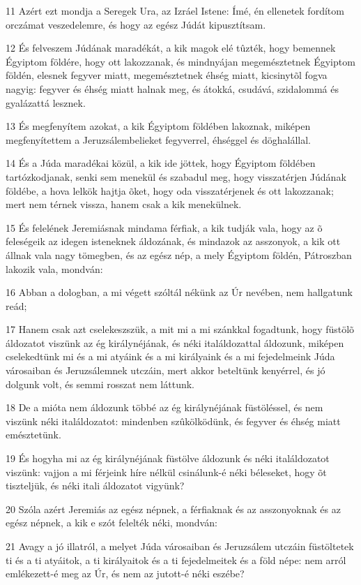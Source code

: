 \par 11 Azért ezt mondja a Seregek Ura, az Izráel Istene: Ímé, én ellenetek fordítom orczámat veszedelemre, és hogy az egész Júdát kipusztítsam.
\par 12 És felveszem Júdának maradékát, a kik magok elé tûzték, hogy bemennek Égyiptom földére, hogy ott lakozzanak, és mindnyájan megemésztetnek Égyiptom földén, elesnek fegyver miatt, megemésztetnek éhség miatt, kicsinytõl fogva nagyig: fegyver és éhség miatt halnak meg, és  átokká, csudává, szidalommá és gyalázattá lesznek.
\par 13 És megfenyítem azokat, a kik Égyiptom földében lakoznak, miképen megfenyítettem a Jeruzsálembelieket fegyverrel, éhséggel és döghalállal.
\par 14 És a Júda maradékai közül, a kik ide jöttek, hogy Égyiptom földében tartózkodjanak, senki sem menekül és szabadul meg, hogy visszatérjen Júdának földébe, a hova lelkök hajtja õket, hogy oda visszatérjenek és ott lakozzanak; mert nem térnek vissza, hanem csak a kik menekülnek.
\par 15 És felelének Jeremiásnak mindama férfiak, a kik tudják vala, hogy az õ feleségeik az idegen isteneknek áldozának, és mindazok az asszonyok, a kik ott állnak vala nagy tömegben, és az egész nép, a mely Égyiptom földén, Pátroszban lakozik vala, mondván:
\par 16 Abban a dologban, a mi végett szóltál nékünk az Úr nevében, nem hallgatunk reád;
\par 17 Hanem csak azt cselekeszszük, a mit mi a mi szánkkal fogadtunk, hogy füstölõ áldozatot viszünk az ég királynéjának, és néki italáldozattal áldozunk, miképen cselekedtünk mi és a mi atyáink és a mi királyaink és a mi fejedelmeink Júda városaiban  és Jeruzsálemnek utczáin, mert akkor beteltünk kenyérrel, és jó dolgunk volt, és semmi rosszat nem láttunk.
\par 18 De a mióta nem áldozunk többé az ég királynéjának füstöléssel, és nem viszünk néki italáldozatot: mindenben szûkölködünk, és fegyver és éhség miatt emésztetünk.
\par 19 És hogyha mi az ég királynéjának füstölve áldozunk és néki italáldozatot viszünk: vajjon a mi férjeink híre nélkül csinálunk-é néki béleseket, hogy õt tiszteljük, és néki itali áldozatot vigyünk?
\par 20 Szóla azért Jeremiás az egész népnek, a férfiaknak és az asszonyoknak és az egész népnek, a kik e szót felelték néki, mondván:
\par 21 Avagy a jó illatról, a melyet Júda városaiban és Jeruzsálem utczáin füstöltetek ti és a ti atyáitok, a ti királyaitok és a ti fejedelmeitek és a föld népe: nem arról emlékezett-é meg az Úr, és nem az jutott-é néki eszébe?
